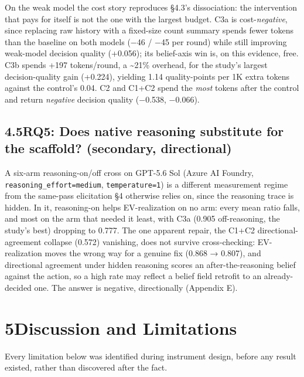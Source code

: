 \documentclass[
  10pt,
]{article}
\begin{document}
On the weak model the cost story reproduces §4.3's dissociation: the intervention that pays for itself is not the one with the largest budget. C3a is cost-\emph{negative}, since replacing raw history with a fixed-size count summary spends fewer tokens than the baseline on both models (−46 / −45 per round) while still improving weak-model decision quality (+0.056); its belief-axis win is, on this evidence, free. C3b spends +197 tokens/round, a \textasciitilde21\% overhead, for the study's largest decision-quality gain (+0.224), yielding 1.14 quality-points per 1K extra tokens against the control's 0.04. C2 and C1+C2 spend the \emph{most} tokens after the control and return \emph{negative} decision quality (−0.538, −0.066).

\subsection{4.5\quad RQ5: Does native reasoning substitute for the scaffold? (secondary, directional)}\label{rq5-does-native-reasoning-substitute-for-the-scaffold-secondary-directional}

A six-arm reasoning-on/off cross on GPT-5.6 Sol (Azure AI Foundry, \texttt{reasoning\_effort=\textquotesingle{}medium\textquotesingle{}}, \texttt{temperature=1}) is a different measurement regime from the same-pass elicitation §4 otherwise relies on, since the reasoning trace is hidden. In it, reasoning-on helps EV-realization on no arm: every mean ratio falls, and most on the arm that needed it least, with C3a (0.905 off-reasoning, the study's best) dropping to 0.777. The one apparent repair, the C1+C2 directional-agreement collapse (0.572) vanishing, does not survive cross-checking: EV-realization moves the wrong way for a genuine fix (0.868 → 0.807), and directional agreement under hidden reasoning scores an after-the-reasoning belief against the action, so a high rate may reflect a belief field retrofit to an already-decided one. The answer is negative, directionally (Appendix E).

\section{5\quad Discussion and Limitations}\label{discussion-and-limitations}

Every limitation below was identified during instrument design, before any result existed, rather than discovered after the fact.
\end{document}
